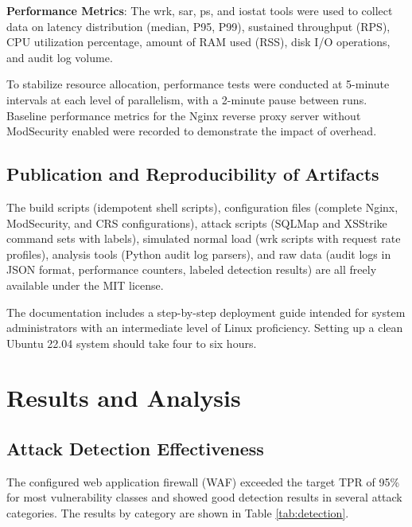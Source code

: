 \documentclass[10pt,conference]{IEEEtran}
\begin{document}
\textbf{Performance Metrics}: The wrk, sar, ps, and iostat tools were used to collect data on latency distribution (median, P95, P99), sustained throughput (RPS), CPU utilization percentage, amount of RAM used (RSS), disk I/O operations, and audit log volume.

To stabilize resource allocation, performance tests were conducted at 5-minute intervals at each level of parallelism, with a 2-minute pause between runs. Baseline performance metrics for the Nginx reverse proxy server without ModSecurity enabled were recorded to demonstrate the impact of overhead.

\subsection{Publication and Reproducibility of Artifacts}

The build scripts (idempotent shell scripts), configuration files (complete Nginx, ModSecurity, and CRS configurations), attack scripts (SQLMap and XSStrike command sets with labels), simulated normal load (wrk scripts with request rate profiles), analysis tools (Python audit log parsers), and raw data (audit logs in JSON format, performance counters, labeled detection results) are all freely available under the MIT license.

The documentation includes a step-by-step deployment guide intended for system administrators with an intermediate level of Linux proficiency. Setting up a clean Ubuntu 22.04 system should take four to six hours.

\section{Results and Analysis}

\subsection{Attack Detection Effectiveness}

The configured web application firewall (WAF) exceeded the target TPR of 95\% for most vulnerability classes and showed good detection results in several attack categories. The results by category are shown in Table \ref{tab:detection}.
\end{document}
